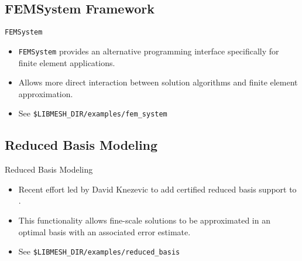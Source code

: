 \subsection{FEMSystem Framework}
\frame
{
  \begin{block}{\texttt{FEMSystem}}
    \begin{itemize}
    \item \texttt{FEMSystem} provides an alternative programming interface specifically for finite element applications.
    \item Allows more direct interaction between solution algorithms and finite element approximation.
    \item See \texttt{\$LIBMESH\_DIR/examples/fem\_system}      
    \end{itemize}
  \end{block}
}


\subsection{Reduced Basis Modeling}
\frame
{
  \begin{block}{Reduced Basis Modeling}
    \begin{itemize}
      \item Recent effort led by David Knezevic to add certified reduced basis support to \libMesh{}.
      \item This functionality allows fine-scale solutions to be approximated in an optimal basis with an associated error estimate.
      \item See \texttt{\$LIBMESH\_DIR/examples/reduced\_basis}
    \end{itemize}
  \end{block}
}
